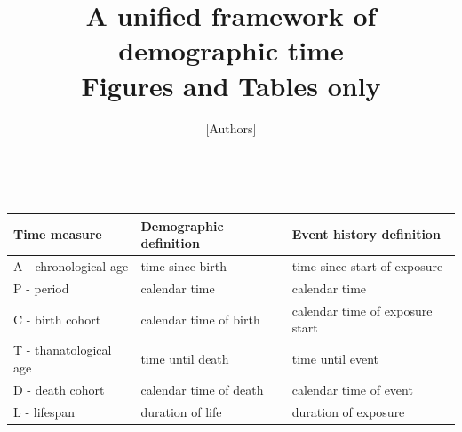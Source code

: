 \documentclass[12pt,oneside,a4paper,doublespacing]{article} %
\theoremstyle{definition}
\begin{document}
\title{A unified framework of demographic time \\ Figures and Tables only}
\author{[Authors]}

\begin{table}[ht!]
\centering
\caption{~}
\label{tab:sixdefs}
\begin{adjustwidth}{0em}{0em}
\begin{tabular}{lll}
\hline 
\textbf{Time measure}	& \textbf{Demographic definition}	& \textbf{Event history definition}	\\ \hline 
A - chronological age 	& time since birth 			& time since start of exposure 		\\
P - period 		        & calendar time 			& calendar time				\\
C - birth cohort 	    & calendar time of birth 	& calendar time of exposure
start
\\
T - thanatological age 	& time until death 			& time until event			\\
D - death cohort	    & calendar time of death	& calendar time of event		\\
L - lifespan		    & duration of life			& duration of exposure			\\ \hline
\end{tabular}
\end{adjustwidth}
\end{table}
\end{document}

